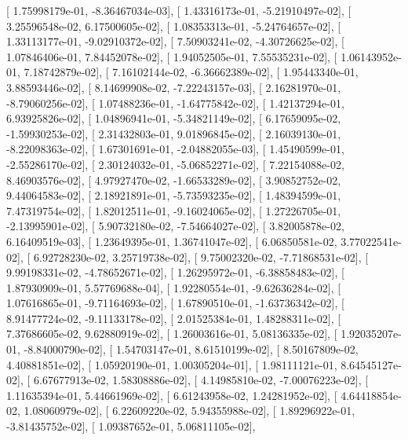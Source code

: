 \documentclass{article}
\begin{document}
       [  1.75998179e-01,  -8.36467034e-03],
       [  1.43316173e-01,  -5.21910497e-02],
       [  3.25596548e-02,   6.17500605e-02],
       [  1.08353313e-01,  -5.24764657e-02],
       [  1.33113177e-01,  -9.02910372e-02],
       [  7.50903241e-02,  -4.30726625e-02],
       [  1.07846406e-01,   7.84452078e-02],
       [  1.94052505e-01,   7.55535231e-02],
       [  1.06143952e-01,   7.18742879e-02],
       [  7.16102144e-02,  -6.36662389e-02],
       [  1.95443340e-01,   3.88593446e-02],
       [  8.14699908e-02,  -7.22243157e-03],
       [  2.16281970e-01,  -8.79060256e-02],
       [  1.07488236e-01,  -1.64775842e-02],
       [  1.42137294e-01,   6.93925826e-02],
       [  1.04896941e-01,  -5.34821149e-02],
       [  6.17659095e-02,  -1.59930253e-02],
       [  2.31432803e-01,   9.01896845e-02],
       [  2.16039130e-01,  -8.22098363e-02],
       [  1.67301691e-01,  -2.04882055e-03],
       [  1.45490599e-01,  -2.55286170e-02],
       [  2.30124032e-01,  -5.06852271e-02],
       [  7.22154088e-02,   8.46903576e-02],
       [  4.97927470e-02,  -1.66533289e-02],
       [  3.90852752e-02,   9.44064583e-02],
       [  2.18921891e-01,  -5.73593235e-02],
       [  1.48394599e-01,   7.47319754e-02],
       [  1.82012511e-01,  -9.16024065e-02],
       [  1.27226705e-01,  -2.13995901e-02],
       [  5.90732180e-02,  -7.54664027e-02],
       [  3.82005878e-02,   6.16409519e-03],
       [  1.23649395e-01,   1.36741047e-02],
       [  6.06850581e-02,   3.77022541e-02],
       [  6.92728230e-02,   3.25719738e-02],
       [  9.75002320e-02,  -7.71868531e-02],
       [  9.99198331e-02,  -4.78652671e-02],
       [  1.26295972e-01,  -6.38858483e-02],
       [  1.87930909e-01,   5.57769688e-04],
       [  1.92280554e-01,  -9.62636284e-02],
       [  1.07616865e-01,  -9.71164693e-02],
       [  1.67890510e-01,  -1.63736342e-02],
       [  8.91477724e-02,  -9.11133178e-02],
       [  2.01525384e-01,   1.48288311e-02],
       [  7.37686605e-02,   9.62880919e-02],
       [  1.26003616e-01,   5.08136335e-02],
       [  1.92035207e-01,  -8.84000790e-02],
       [  1.54703147e-01,   8.61510199e-02],
       [  8.50167809e-02,   4.40881851e-02],
       [  1.05920190e-01,   1.00305204e-01],
       [  1.98111121e-01,   8.64545127e-02],
       [  6.67677913e-02,   1.58308886e-02],
       [  4.14985810e-02,  -7.00076223e-02],
       [  1.11635394e-01,   5.44661969e-02],
       [  6.61243958e-02,   1.24281952e-02],
       [  4.64418854e-02,   1.08060979e-02],
       [  6.22609220e-02,   5.94355988e-02],
       [  1.89296922e-01,  -3.81435752e-02],
       [  1.09387652e-01,   5.06811105e-02],
\end{document}
